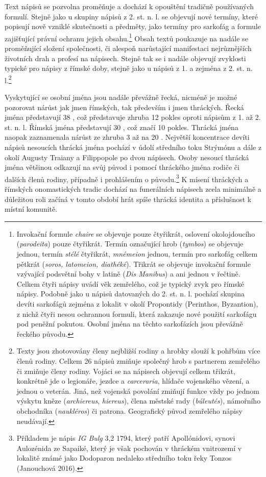 Text nápisů se pozvolna proměňuje a dochází k opouštění tradičně používaných formulí. Stejně jako u skupiny nápisů z 2. st. n. l. se objevují nové termíny, které popisují nově vzniklé skutečnosti a předměty, jako termíny pro sarkofág a formule zajišťující právní ochranu jejich obsahu.\footnote{Invokační formule {\em chaire} se objevuje pouze čtyřikrát, oslovení okolojdoucího ({\em parodeita}) pouze čtyřikrát. Termín označující hrob ({\em tymbos}) se objevuje jednou, termín {\em stélé} čtyřikrát, {\em mnémeion} jednou, termín pro sarkofág celkem pětkrát ({\em soros, latomeion, diathéké}). Třikrát se objevuje invokační formule vzývající podsvětní bohy v latině ({\em Dis Manibus}) a ani jednou v řečtině. Celkem čtyři nápisy uvádí věk zemřelého, což je typický zvyk pro římské nápisy. Podobně jako u nápisů datovaných do 2. st. n. l. pochází skupina devíti sarkofágů zejména z lokalit v okolí Propontidy (Perinthos, Byzantion), z nichž čtyři nesou ochrannou formuli, která zakazuje nové použití sarkofágu pod peněžní pokutou. Osobní jména na těchto sarkofázích jsou převážně řeckého původu.} Obsah textů poukazuje na nadále se proměňující složení společnosti, či alespoň narůstající manifestaci nejrůznějších životních drah a profesí na nápisech. Stejně tak se i nadále objevují zvyklosti typické pro nápisy z římské doby, stejně jako u nápisů z 1. a zejména z 2. st. n. l.\footnote{Texty jsou zhotovovány členy nejbližší rodiny a hrobky slouží k pohřbům více členů rodiny. Celkem 26 nápisů zmiňuje společný hrob s partnerem zemřelého či zmiňuje členy rodiny. Vojáci se na nápisech objevují celkem třikrát, konkrétně jde o legionáře, jezdce a {\em carceraria}, hlídače vojenského vězení, a jednou o veterán. Jiná, než vojenská povolání zmiňují funkce vždy po jednom výskytu kněze ({\em archiereus}, {\em hiereus}), člena městské rady ({\em búleutés}), námořního obchodníka ({\em naukléros}) či patrona. Geografický původ zemřelého nápisy neudávají.}

Vyskytující se osobní jména jsou nadále převážně řecká, nicméně je možné pozorovat nárůst jak jmen římských, tak především i jmen thráckých. Řecká jména představují 38 , což představuje zhruba 12  pokles oproti nápisům z 1. až 2. st. n. l. Římská jména představují 30 , což značí 10  pokles. Thrácká jména naopak zaznamenala nárůst ze zhruba 3  až na 20 . Největší koncentrace devíti nápisů nesoucích thrácká jména pochází v údolí středního toku Strýmónu a dále z okolí Augusty Traiany a Filippopole po dvou nápisech. Osoby nesoucí thrácká jména většinou odkazují na svůj původ i pomocí thráckého jména rodiče či dalších členů rodiny, případně i prohlášením o původu.\footnote{Příkladem je nápis {\em IG Bulg} 3,2 1794, který patří Apollónidovi, synovi Aulozénida ze Sapaiké, který je však pochován v thráckém vnitrozemí v lokalitě známé jako Dodoparon nedaleko středního toku řeky Tonzos (Janouchová 2016).} K mísení thráckých a římských onomastických tradic dochází na funerálních nápisech zcela minimálně a důležitou roli začíná v tomto období hrát spíše thrácká identita a příslušnost k místní komunitě.

